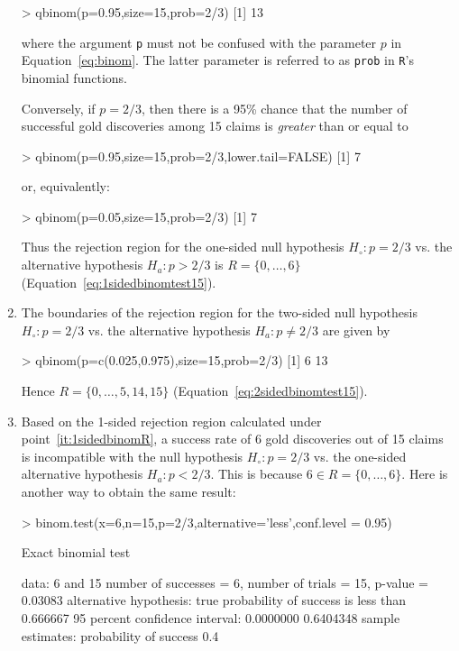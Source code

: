 \begin{enumerate}
\begin{console}
> qbinom(p=0.95,size=15,prob=2/3)
[1] 13
\end{console}

\noindent where the argument \texttt{p} must not be confused with the
parameter $p$ in Equation~\ref{eq:binom}. The latter parameter is
referred to as \texttt{prob} in \texttt{R}'s binomial functions.

Conversely, if $p=2/3$, then there is a 95\% chance that the number of
successful gold discoveries among 15 claims is \emph{greater} than or
equal to
  
\begin{console}
> qbinom(p=0.95,size=15,prob=2/3,lower.tail=FALSE)
[1] 7
\end{console}

\noindent or, equivalently:

\begin{console}
> qbinom(p=0.05,size=15,prob=2/3)
[1] 7
\end{console}

Thus the rejection region for the one-sided null hypothesis $H_\circ:
p=2/3$ vs. the alternative hypothesis $H_a: p>2/3$ is $R =
\{0,\ldots,6\}$ (Equation~\ref{eq:1sidedbinomtest15}).

\item\label{it:2sidedbinomR} The boundaries of the rejection region
  for the two-sided null hypothesis $H_\circ: p=2/3$ vs. the
  alternative hypothesis $H_a: p\neq{2/3}$ are given by

\begin{console}
> qbinom(p=c(0.025,0.975),size=15,prob=2/3)
[1] 6 13
\end{console}

Hence $R = \{0,\ldots,5,14,15\}$
(Equation~\ref{eq:2sidedbinomtest15}).

\item Based on the 1-sided rejection region calculated under
  point~\ref{it:1sidedbinomR}, a success rate of 6 gold discoveries
  out of 15 claims is incompatible with the null hypothesis $H_\circ:
  p=2/3$ vs.  the one-sided alternative hypothesis $H_a: p<2/3$. This
  is because $6 \in R=\{0,\ldots,6\}$.  Here is another way to obtain
  the same result:

\begin{console}
> binom.test(x=6,n=15,p=2/3,alternative='less',conf.level = 0.95)

	Exact binomial test

data:  6 and 15
number of successes = 6, number of trials = 15, p-value = 0.03083
alternative hypothesis: true probability of success is less than 0.666667
95 percent confidence interval:
 0.0000000 0.6404348
sample estimates:
probability of success 
                   0.4   
\end{console}


\end{enumerate}
